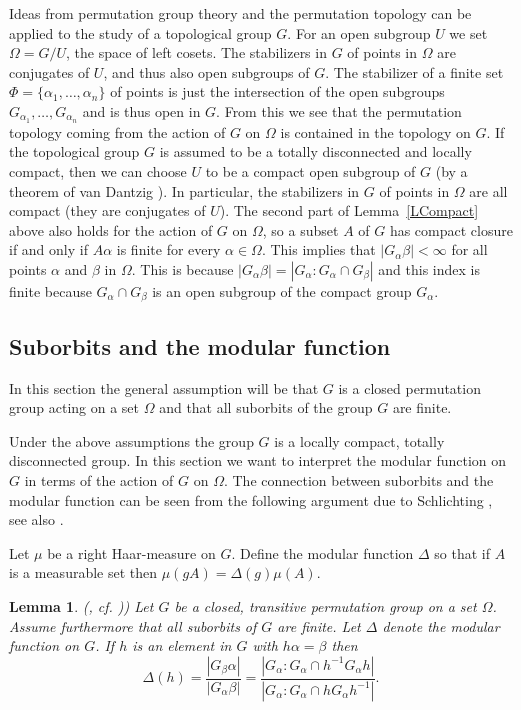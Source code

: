\documentclass{emsprocart}
\newtheorem{lemma}[theorem]{Lemma}
\theoremstyle{definition}
\begin{document}
  Ideas from
permutation group theory and the permutation topology can  be
applied to the study of a topological group $G$.  For an
open subgroup
$U$  we set $\Omega=G/U$, the space of left
cosets.   The stabilizers in $G$ of points in $\Omega$ are conjugates
of $U$, and thus also open subgroups of $G$.  The stabilizer of a finite set
$\Phi=\{\alpha_1, \ldots, \alpha_n\}$ of points is just the
intersection of the  open subgroups $G_{\alpha_1}, \ldots,
G_{\alpha_n}$ and is thus open in $G$.  From this we see that the
permutation topology coming from the action of $G$ on $\Omega$ is
contained in the topology on $G$.  If the topological group
$G$ is assumed to be
 a totally disconnected and
locally compact, then we can choose  $U$ to
be a compact open subgroup of $G$
(by a theorem of van Dantzig \cite{Dantzig1936}).
In particular, the stabilizers in $G$ of
points in $\Omega$ are all compact (they are conjugates of $U$).
 The second part of  Lemma~\ref{LCompact}
above also holds for the action of $G$ on $\Omega$, so a subset $A$ of
$G$ has compact closure if and only if $A\alpha$ is finite for every
$\alpha \in \Omega$.    This
implies that $|G_\alpha\beta|< \infty$ for all points
$\alpha$ and $\beta$ in $\Omega$.  This is because
$|G_\alpha\beta|=|G_\alpha:G_\alpha\cap G_\beta|$ and this index is
finite because $G_\alpha\cap G_\beta$ is an open subgroup of the
compact group $G_\alpha$.

\subsection{Suborbits and the modular function}
In this section the general assumption will be that $G$ is a closed
permutation group acting on a set $\Omega$ and that
all suborbits of the group $G$ are finite.

Under the above assumptions the group $G$ is a locally compact, totally
disconnected group.  In this section we want to interpret the modular
function on $G$ in terms of the action of $G$ on $\Omega$.
The connection between suborbits and the modular function can be seen from
the following argument due to  Schlichting \cite{Schlichting1979}, see
also \cite{Trofimov1985a}.

Let $\mu$ be a right
Haar-measure on $G$.  Define the modular function $\Delta$
so that if
$A$ is a measurable set then $\mu(gA)=\Delta(g)\mu(A)$.

\begin{lemma} \label{LModular}
{\rm (\cite[Lemma 1]{Schlichting1979}, cf. \cite[Theorem 1]{Trofimov1985a})})
Let $G$ be a closed, transitive permutation
group on a set $\Omega$.  Assume furthermore that all
suborbits of $G$ are finite.  Let $\Delta$ denote the modular function
on $G$.  If  $h$ is an element in $G$ with $h\alpha=\beta$ then
  $$\Delta(h)=\frac{|G_\beta\alpha|}{|G_\alpha\beta|}=
\frac{|G_\alpha:G_\alpha\cap h^{-1}G_\alpha h|}
{|G_\alpha:G_\alpha\cap hG_\alpha h^{-1}|}.$$
\end{lemma}
\end{document}
